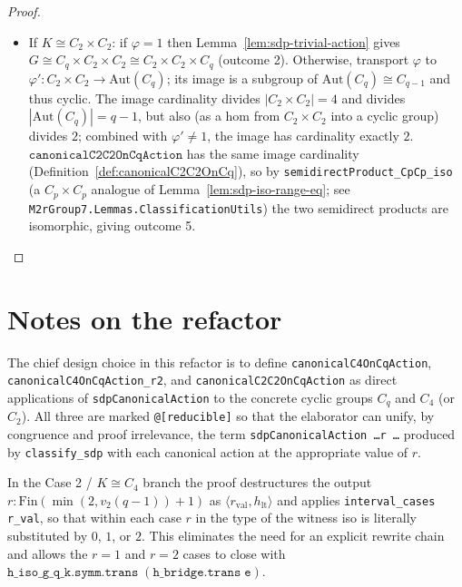 \begin{proof}
\begin{itemize}
        \item If $K \cong C_2 \times C_2$: if $\varphi = 1$ then
            Lemma~\ref{lem:sdp-trivial-action} gives
            $G \cong C_q \times C_2 \times C_2 \cong C_2 \times C_2 \times C_q$
            (outcome 2). Otherwise, transport $\varphi$ to
            $\varphi' : C_2 \times C_2 \to \mathrm{Aut}(C_q)$; its image is a
            subgroup of $\mathrm{Aut}(C_q) \cong C_{q-1}$ and thus cyclic.
            The image cardinality divides $|C_2 \times C_2| = 4$ and divides
            $|\mathrm{Aut}(C_q)| = q - 1$, but also (as a hom from
            $C_2 \times C_2$ into a cyclic group) divides $2$; combined with
            $\varphi' \neq 1$, the image has cardinality exactly $2$.
            $\mathtt{canonicalC2C2OnCqAction}$ has the same image cardinality
            (Definition~\ref{def:canonicalC2C2OnCq}), so by
            \texttt{semidirectProduct\_CpCp\_iso} (a $C_p \times C_p$ analogue
            of Lemma~\ref{lem:sdp-iso-range-eq}; see
            \texttt{M2rGroup7.Lemmas.ClassificationUtils}) the two semidirect
            products are isomorphic, giving outcome 5.
    \end{itemize}
\end{proof}

\section{Notes on the refactor}

The chief design choice in this refactor is to define
\texttt{canonicalC4OnCqAction}, \texttt{canonicalC4OnCqAction\_r2}, and
\texttt{canonicalC2C2OnCqAction} as direct applications of
\texttt{sdpCanonicalAction} to the concrete cyclic groups $C_q$ and $C_4$ (or
$C_2$). All three are marked \texttt{@[reducible]} so that the elaborator can
unify, by congruence and proof irrelevance, the term
\texttt{sdpCanonicalAction \dots r \dots} produced by
\texttt{classify\_sdp} with each canonical action at the appropriate value of
$r$.

In the Case 2 / $K \cong C_4$ branch the proof destructures the output
$r : \mathrm{Fin}(\min(2, v_2(q-1)) + 1)$ as $\langle r_{\mathrm{val}},
h_{\mathrm{lt}} \rangle$ and applies \texttt{interval\_cases r\_val}, so
that within each case $r$ in the type of the witness iso is literally
substituted by $0$, $1$, or $2$. This eliminates the need for an explicit
rewrite chain and allows the $r = 1$ and $r = 2$ cases to close with
$\mathtt{h\_iso\_g\_q\_k.symm.trans\;(h\_bridge.trans\;e)}$.


